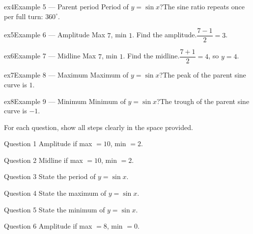 \documentclass[11pt]{article}
\begin{document}
\begin{example}{ex4}{Example 5 --- Parent period}
Period of $y=\sin x$?\soln The sine ratio repeats once per full turn: $360^\circ$.
\end{example}

\begin{example}{ex5}{Example 6 --- Amplitude}
Max $7$, min $1$. Find the amplitude.\soln $\dfrac{7-1}{2}=3$.
\end{example}

\begin{example}{ex6}{Example 7 --- Midline}
Max $7$, min $1$. Find the midline.\soln $\dfrac{7+1}{2}=4$, so $y=4$.
\end{example}

\begin{example}{ex7}{Example 8 --- Maximum}
Maximum of $y=\sin x$?\soln The peak of the parent sine curve is $1$.
\end{example}

\begin{example}{ex8}{Example 9 --- Minimum}
Minimum of $y=\sin x$?\soln The trough of the parent sine curve is $-1$.
\end{example}

\clearpage
{}
For each question, show all steps clearly in the space provided.

\begin{qbox}{Question 1}
Amplitude if max $=10$, min $=2$.\workspace{2.4cm}
\end{qbox}

\begin{qbox}{Question 2}
Midline if max $=10$, min $=2$.\workspace{2.4cm}
\end{qbox}

\begin{qbox}{Question 3}
State the period of $y=\sin x$.\workspace{2.4cm}
\end{qbox}

\begin{qbox}{Question 4}
State the maximum of $y=\sin x$.\workspace{2.4cm}
\end{qbox}

\begin{qbox}{Question 5}
State the minimum of $y=\sin x$.\workspace{2.4cm}
\end{qbox}

\begin{qbox}{Question 6}
Amplitude if max $=8$, min $=0$.\workspace{2.4cm}
\end{qbox}
\end{document}
